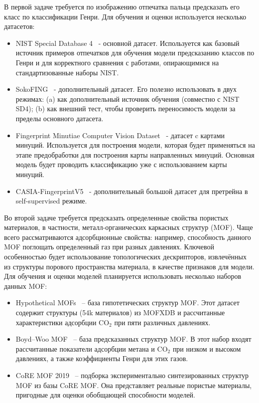 В первой задаче требуется по изображению отпечатка пальца предсказать его класс по классификации Генри. Для обучения и оценки используется несколько датасетов:
\begin{itemize}
\item NIST Special Database 4~\cite{NIST-SD-4} - основной датасет. Используется как базовый источник примеров отпечатков для обучения модели предсказанию классов по Генри и для корректного сравнения с работами, опирающимися на стандартизованные наборы NIST.
\item SokoFING~\cite{SOCOFing} - дополнительный датасет. Его полезно использовать в двух режимах: (a) как дополнительный источник обучения (совместно с NIST SD4); (b) как внешний тест, чтобы проверить переносимость модели за пределы основного датасета.
\item Fingerprint Minutiae Computer Vision Dataset~\cite{fingerprint-minutiae-dataset} - датасет c картами минуций. Используется для построения модели, которая будет применяться на этапе предобработки для построения карты направленных минуций. Основная модель будет проводить классификацию уже с использованием карты минуций. 
\item CASIA-FingerprintV5~\cite{CASIA-fingerprintV5} - дополнительный большой датасет для претрейна в self-supervised режиме.
\end{itemize}


Во второй задаче требуется предсказать определенные свойства пористых материалов, в частности, металл-органических каркасных структур (MOF). Чаще всего рассматриваются адсорбционные свойства: например, способность данного MOF поглощать определенный газ при разных давлениях. Ключевой особенностью будет использование топологических дескрипторов, извлечённых из структуры порового пространства материала, в качестве признаков для модели. Для обучения и оценки моделей планируется использовать несколько наборов данных MOF:

\begin{itemize}
\item Hypothetical MOFs~\cite{Wilmer2012} – база гипотетических структур MOF. Этот датасет содержит структуры (54k материалов) из MOFXDB и рассчитанные характеристики адсорбции $\text{CO}_2$ при пяти различных давлениях.
\item Boyd–Woo MOF~\cite{Boyd-Woo} – база предсказанных структур MOF. В этот набор входят рассчитанные показатели адсорбции метана и $\text{CO}_2$ при низком и высоком давлениях, а также коэффициенты Генри для этих газов.
\item CoRE MOF 2019~\cite{CoreMOF2019} – подборка экспериментально синтезированных структур MOF из базы CoRE MOF. Она представляет реальные пористые материалы, пригодные для оценки обобщающей способности моделей.
\end{itemize}


